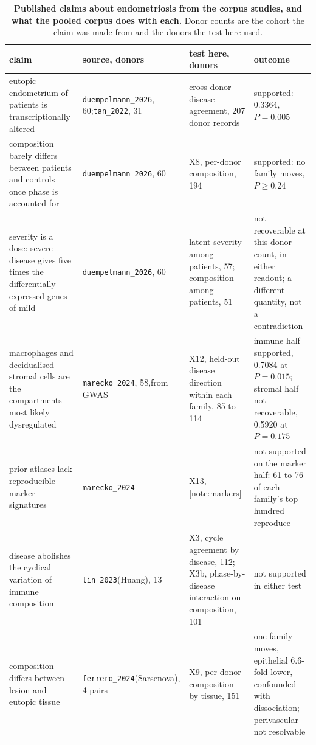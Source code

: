 \begin{table}[p]
\centering
\caption[The claims ledger]{\textbf{Published claims about endometriosis
from the corpus studies, and what the pooled corpus does with each.} Donor
counts are the cohort the claim was made from and the donors the test here
used.}
\label{stab:ledger}
\footnotesize\setlength{\tabcolsep}{3pt}
\begin{tabular}{@{}p{40mm}p{30mm}p{38mm}p{44mm}@{}}
\toprule
claim & source, donors & test here, donors & outcome \\
\midrule
eutopic endometrium of patients is transcriptionally altered & \texttt{duempelmann\_2026}, 60;\newline \texttt{tan\_2022}, 31 & cross-donor disease agreement, 207 donor records & supported: 0.3364, $P = 0.005$ \\
composition barely differs between patients and controls once phase is accounted for & \texttt{duempelmann\_2026}, 60 & X8, per-donor composition, 194 & supported: no family moves, $P \geq 0.24$ \\
severity is a dose: severe disease gives five times the differentially expressed genes of mild & \texttt{duempelmann\_2026}, 60 & latent severity among patients, 57; composition among patients, 51 & not recoverable at this donor count, in either readout; a different quantity, not a contradiction \\
macrophages and decidualised stromal cells are the compartments most likely dysregulated & \texttt{marecko\_2024}, 58,\newline from GWAS & X12, held-out disease direction within each family, 85 to 114 & immune half supported, 0.7084 at $P = 0.015$; stromal half not recoverable, 0.5920 at $P = 0.175$ \\
prior atlases lack reproducible marker signatures & \texttt{marecko\_2024} & X13, \ref{note:markers} & not supported on the marker half: 61 to 76 of each family's top hundred reproduce \\
disease abolishes the cyclical variation of immune composition & \texttt{lin\_2023}\newline (Huang), 13 & X3, cycle agreement by disease, 112; X3b, phase-by-disease interaction on composition, 101 & not supported in either test \\
composition differs between lesion and eutopic tissue & \texttt{ferrero\_2024}\newline (Sarsenova), 4 pairs & X9, per-donor composition by tissue, 151 & one family moves, epithelial 6.6-fold lower, confounded with dissociation; perivascular not resolvable \\

\end{tabular}
\end{table}

